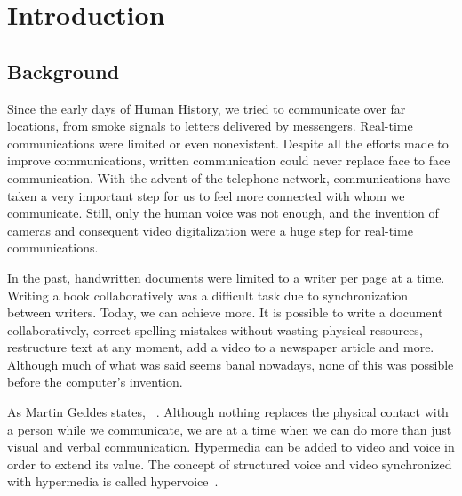 \chapter{Introduction}
\label{chapter:introduction}

\section{Background}
\label{section:background}

	Since the early days of Human History, we tried to communicate over far locations, from smoke signals to letters delivered by messengers. Real-time communications were limited or even nonexistent. Despite all the efforts made to improve communications, written communication could never replace face to face communication.
	With the advent of the telephone network, communications have taken a very important step for us to feel more connected with whom we communicate. Still, only the human voice was not enough, and the invention of cameras and consequent video digitalization were a huge step for real-time communications.

	In the past, handwritten documents were limited to a writer per page at a time. Writing a book collaboratively was a difficult task due to synchronization between writers.
	Today, we can achieve more. It is possible to write a document collaboratively, correct spelling mistakes without wasting physical resources, restructure text at any moment, add a video to a newspaper article and more. Although much of what was said seems banal nowadays, none of this was possible before the computer's invention. 

	As Martin Geddes states, ~\cite{geddes}. Although nothing replaces the physical contact with a person while we communicate, we are at a time when we can do more than just visual and verbal communication. Hypermedia can be added to video and voice in order to extend its value. The concept of structured voice and video synchronized with hypermedia is called hypervoice~\cite{geddes}.

